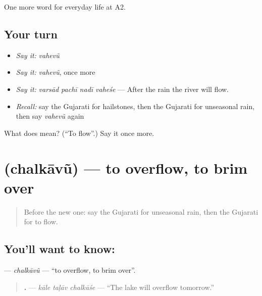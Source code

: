 \begin{grammarlens}[title={What you've built}]
One more word for everyday life at A2.
\end{grammarlens}

\subsection*{Your turn}
\begin{itemize}
\raggedright
  \item \emph{Say it:} \emph{vahevũ}
  \item \emph{Say it:} \emph{vahevũ}, once more
  \item \emph{Say it:} \emph{varsād pachī nadī vaheśe} — After the rain the river will flow.
  \item \emph{Recall:} say the Gujarati for hailstones, then the Gujarati for unseasonal rain, then say \emph{vahevũ} again
\end{itemize}

\begin{tcolorbox}[breakable,colback=teal!4,colframe=teal!35!black,title={Before you move on}]
What does  mean? (\textquotedblleft{}To flow\textquotedblright{}.) Say it once more.
\end{tcolorbox}
\section[\texorpdfstring{\gu{છલકાવું} (chalkāvũ)}{છલકાવું (chalkāvũ)}]{ (chalkāvũ) — to overflow, to brim over}

\label{lesson:GU-C220-chalkavu}



\begin{quote}
Before the new one: say the Gujarati for unseasonal rain, then the Gujarati for to flow.
\end{quote}

\subsection*{You'll want to know: }
\textbf{} — \emph{chalkāvũ} — \textquotedblleft{}to overflow, to brim over\textquotedblright{}.

\begin{quote}
\textbf{  .} — \emph{kāle taḷāv chalkāśe} — \textquotedblleft{}The lake will overflow tomorrow.\textquotedblright{}
\end{quote}

